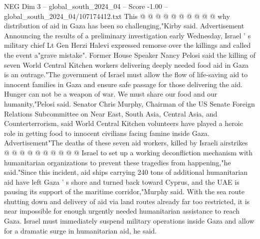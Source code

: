 \begin{textsample}{NEG Dim 3 – global\_south\_2024\_04 – Score -1.00 – global\_south\_2024\_04/107174412.txt}
This @ @ @ @ @ @ @ @ @ @ why distribution of aid in Gaza has been so challenging,"Kirby said.
Advertisement Announcing the results of a preliminary investigation early Wednesday, Israel ' s military chief Lt Gen Herzi Halevi expressed remorse over the killings and called the event a"grave mistake".
Former House Speaker Nancy Pelosi said the killing of seven World Central Kitchen workers delivering deeply needed food aid in Gaza is an outrage."The government of Israel must allow the flow of life-saving aid to innocent families in Gaza and ensure safe passage for those delivering the aid.
Hunger can not be a weapon of war.
We must share our food and our humanity,"Pelosi said.
Senator Chris Murphy, Chairman of the US Senate Foreign Relations Subcommittee on Near East, South Asia, Central Asia, and Counterterrorism, said World Central Kitchen volunteers have played a heroic role in getting food to innocent civilians facing famine inside Gaza.
Advertisement"The deaths of these seven aid workers, killed by Israeli airstrikes @ @ @ @ @ @ @ @ @ @ Israel to set up a working deconfliction mechanism with humanitarian organizations to prevent these tragedies from happening,"he said."Since this incident, aid ships carrying 240 tons of additional humanitarian aid have left Gaza ' s shore and turned back toward Cyprus, and the UAE is pausing its support of the maritime corridor,"Murphy said.
With the sea route shutting down and delivery of aid via land routes already far too restricted, it is near impossible for enough urgently needed humanitarian assistance to reach Gaza.
Israel must immediately suspend military operations inside Gaza and allow for a dramatic surge in humanitarian aid, he said.

\end{textsample}
